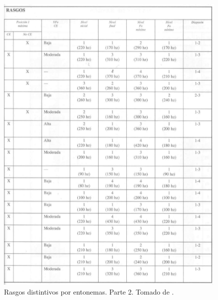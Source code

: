 \begin{figure}
\begin{center}
\includegraphics[width= 1\columnwidth]{Graphics/rasgos_dist2}
\caption{Rasgos distintivos por entonemas. Parte 2. Tomado de \cite[p.219]{garcia1996aspectos2}.}
\label{rasgos_dist2}
\end{center}
\end{figure}




